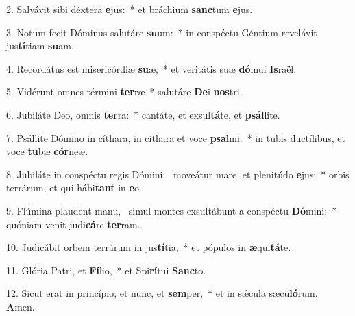 2. Salvávit sibi déxtera \textbf{e}jus:~*  et bráchium \textbf{sanc}tum \textbf{e}jus.\

3. Notum fecit Dóminus salutáre \textbf{su}um:~*  in conspéctu Géntium revelávit jus\textbf{tí}tiam \textbf{su}am.\

4. Recordátus est misericórdiæ \textbf{su}æ,~*  et veritátis suæ \textbf{dó}mui \textbf{Is}raël.\

5. Vidérunt omnes términi \textbf{ter}ræ~*  salutáre \textbf{De}i \textbf{nos}tri.\

6. Jubiláte Deo, omnis \textbf{ter}ra:~*  cantáte, et exsul\textbf{tá}te, et \textbf{psál}lite.\

7. Psállite Dómino in cíthara, in cíthara et voce \textbf{psal}mi:~*  in tubis ductílibus, et voce \textbf{tu}bæ \textbf{cór}neæ.\

8. Jubiláte in conspéctu regis Dómini: \dag\  moveátur mare, et plenitúdo \textbf{e}jus:~*  orbis terrárum, et qui hábi\textbf{tant} in \textbf{e}o.\

9. Flúmina plaudent manu, \dag\  simul montes exsultábunt a conspéctu \textbf{Dó}mini:~*  quóniam venit judi\textbf{cá}re \textbf{ter}ram.\

10. Judicábit orbem terrárum in jus\textbf{tí}tia,~*  et pópulos in \textbf{æ}qui\textbf{tá}te.\

11. Glória Patri, et \textbf{Fí}lio,~*  et Spi\textbf{rí}tui \textbf{Sanc}to.\

12. Sicut erat in princípio, et nunc, et \textbf{sem}per,~*  et in sǽcula sæcu\textbf{ló}rum. \textbf{A}men.\

